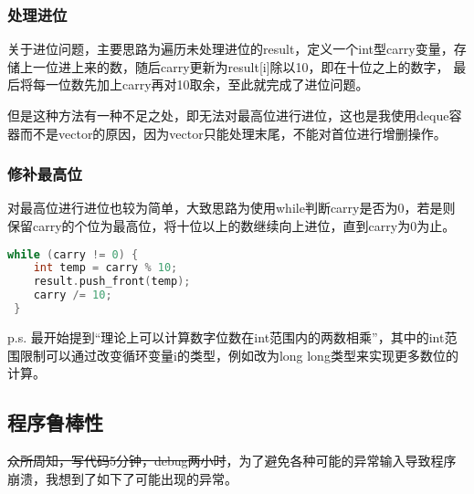 \documentclass[a4paper, 11pt, UTF8]{ctexart}
\begin{document}
\subsubsection{处理进位}

关于进位问题，主要思路为遍历未处理进位的result，定义一个int型carry变量，存储上一位进上来的数，随后carry更新为result[i]除以10，即在十位之上的数字，
最后将每一位数先加上carry再对10取余，至此就完成了进位问题。

但是这种方法有一种不足之处，即无法对最高位进行进位，这也是我使用deque容器而不是vector的原因，因为vector只能处理末尾，不能对首位进行增删操作。

\subsubsection{修补最高位}

对最高位进行进位也较为简单，大致思路为使用while判断carry是否为0，若是则保留carry的个位为最高位，将十位以上的数继续向上进位，直到carry为0为止。

\begin{lstlisting}[language=C++, basicstyle=\ttfamily]
while (carry != 0) {
	int temp = carry % 10;
	result.push_front(temp);
	carry /= 10;
 }
\end{lstlisting}

p.s. 最开始提到“理论上可以计算数字位数在int范围内的两数相乘”，其中的int范围限制可以通过改变循环变量i的类型，例如改为long long类型来实现更多数位的计算。

\subsection{程序鲁棒性}

\sout{众所周知，写代码5分钟，debug两小时}，为了避免各种可能的异常输入导致程序崩溃，我想到了如下了可能出现的异常。
\end{document}
